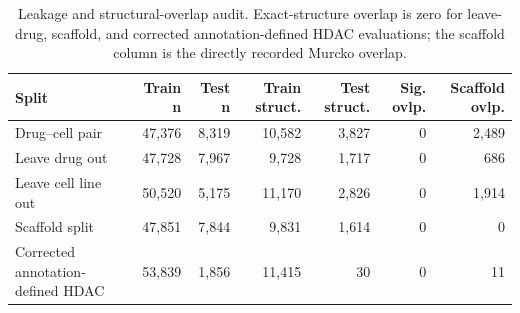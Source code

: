 \begingroup
\scriptsize
\begin{table}[H]
\centering
\caption{Leakage and structural-overlap audit. Exact-structure overlap is zero for leave-drug, scaffold, and corrected annotation-defined HDAC evaluations; the scaffold column is the directly recorded Murcko overlap.}
\label{tab:s_split}
\begin{tabular}{@{}lrrrrrr@{}}
\toprule
Split & Train n & Test n & Train struct. & Test struct. & Sig. ovlp. & Scaffold ovlp. \\
\midrule
Drug--cell pair & 47,376 & 8,319 & 10,582 & 3,827 & 0 & 2,489 \\
Leave drug out & 47,728 & 7,967 & 9,728 & 1,717 & 0 & 686 \\
Leave cell line out & 50,520 & 5,175 & 11,170 & 2,826 & 0 & 1,914 \\
Scaffold split & 47,851 & 7,844 & 9,831 & 1,614 & 0 & 0 \\
Corrected annotation-defined HDAC & 53,839 & 1,856 & 11,415 & 30 & 0 & 11 \\
\bottomrule
\end{tabular}
\end{table}
\endgroup
